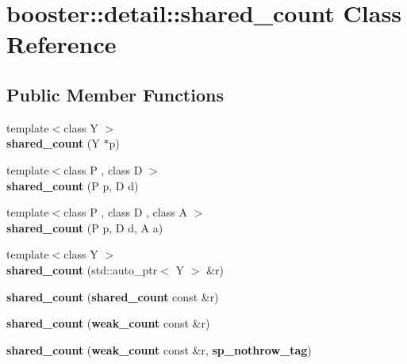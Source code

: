 \section{booster\-:\-:detail\-:\-:shared\-\_\-count \-Class \-Reference}
\label{classbooster_1_1detail_1_1shared__count}
\subsection*{\-Public \-Member \-Functions}
\begin{DoxyCompactItemize}
\item 
{\footnotesize template$<$class Y $>$ }\\{\bfseries shared\-\_\-count} (\-Y $\ast$p)\label{classbooster_1_1detail_1_1shared__count_a4ce5c246ea8c1bd5af70f348b30c2d22}

\item 
{\footnotesize template$<$class P , class D $>$ }\\{\bfseries shared\-\_\-count} (\-P p, \-D d)\label{classbooster_1_1detail_1_1shared__count_a8f9da198bb47c5e4b2b3b6a4561ab9e8}

\item 
{\footnotesize template$<$class P , class D , class A $>$ }\\{\bfseries shared\-\_\-count} (\-P p, \-D d, \-A a)\label{classbooster_1_1detail_1_1shared__count_abaf623b57b2781e8aa61e4a42f74bf33}

\item 
{\footnotesize template$<$class Y $>$ }\\{\bfseries shared\-\_\-count} (std\-::auto\-\_\-ptr$<$ \-Y $>$ \&r)\label{classbooster_1_1detail_1_1shared__count_a2c6839fce2332dd54223625c5359b443}

\item 
{\bfseries shared\-\_\-count} ({\bf shared\-\_\-count} const \&r)\label{classbooster_1_1detail_1_1shared__count_aef86aa9561b40e8a5577960f8fb9e718}

\item 
{\bfseries shared\-\_\-count} ({\bf weak\-\_\-count} const \&r)\label{classbooster_1_1detail_1_1shared__count_a7ec7df6edb6c6dba29b4844151ebc696}

\item 
{\bfseries shared\-\_\-count} ({\bf weak\-\_\-count} const \&r, {\bf sp\-\_\-nothrow\-\_\-tag})\label{classbooster_1_1detail_1_1shared__count_a7cecf7e90b810ab6ca77948c760ca395}


\end{DoxyCompactItemize}
